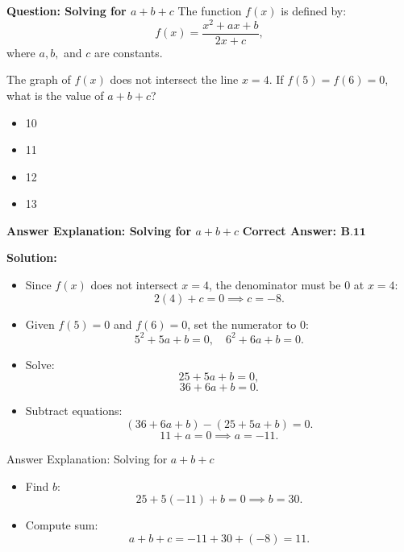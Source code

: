 \documentclass{beamer}
\begin{document}
\begin{frame}{\textbf{Question: Solving for \( a + b + c \)}}
    The function \( f(x) \) is defined by:
    \[
    f(x) = \frac{x^2 + ax + b}{2x + c},
    \]
    where \( a, b, \) and \( c \) are constants.  

    \vspace{0.3cm}
    The graph of \( f(x) \) does not intersect the line \( x = 4 \).  
    If \( f(5) = f(6) = 0 \), what is the value of \( a + b + c \)?

    \vspace{0.5cm}
    \begin{itemize}
        \item[A.] 10
        \item[B.] 11
        \item[C.] 12
        \item[D.] 13
    \end{itemize}
\end{frame}

\begin{frame}{\textbf{Answer Explanation: Solving for \( a + b + c \)}}
    \textbf{Correct Answer: \textcolor{novelPurple}{\( \mathbf{B. 11} \)}}  

    \vspace{0.3cm}
    \textbf{Solution:}
    \begin{itemize}
        \item Since \( f(x) \) does not intersect \( x = 4 \), the denominator must be 0 at \( x = 4 \):
        \[
        2(4) + c = 0 \implies c = -8.
        \]
        \item Given \( f(5) = 0 \) and \( f(6) = 0 \), set the numerator to 0:
        \[
        5^2 + 5a + b = 0, \quad 6^2 + 6a + b = 0.
        \]
        \item Solve:
        \[
        25 + 5a + b = 0,
        \]
        \[
        36 + 6a + b = 0.
        \]
        \item Subtract equations:
        \[
        (36 + 6a + b) - (25 + 5a + b) = 0.
        \]
        \[
        11 + a = 0 \implies a = -11.
        \]

    \end{itemize}

\end{frame}

\begin{frame}{Answer Explanation: Solving for \( a + b + c \)} 
\begin{itemize}
        \item Find \( b \):
        \[
        25 + 5(-11) + b = 0 \implies b = 30.
        \]
        \item Compute sum:
        \[
        a + b + c = -11 + 30 + (-8) = 11.
        \]
    \end{itemize}
    
\end{frame}
\end{document}
